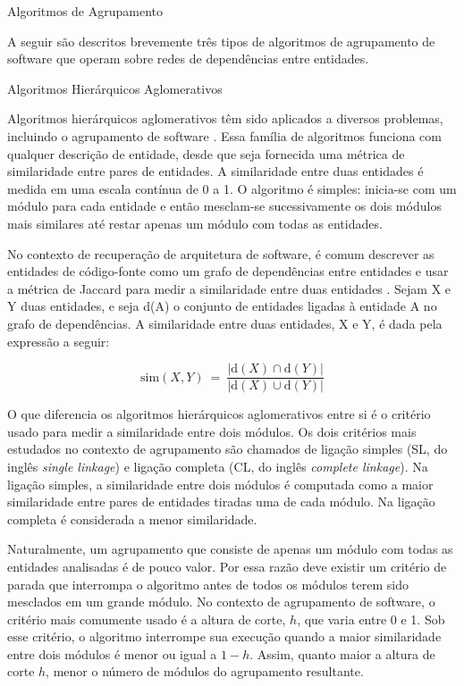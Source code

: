 \begin{chapter}{Algoritmos de Agrupamento} \label{cap:agrupamento}

A seguir são descritos brevemente três tipos de algoritmos de agrupamento de software que operam sobre redes de dependências entre entidades. %

\begin{section}{Algoritmos Hierárquicos Aglomerativos}

Algoritmos hierárquicos aglomerativos têm sido aplicados a diversos problemas, incluindo o agrupamento de software \cite{Anquetil1999,Maqbool2007}. Essa família de algoritmos funciona com qualquer descrição de entidade, desde que seja fornecida uma métrica de similaridade entre pares de entidades. A similaridade entre duas entidades é medida em uma escala contínua de 0 a 1. O algoritmo é simples: inicia-se com um módulo para cada entidade e então mesclam-se sucessivamente os dois módulos mais similares até restar apenas um módulo com todas as entidades.

No contexto de recuperação de arquitetura de software, é comum descrever as entidades de código-fonte como um grafo de dependências entre entidades e usar a métrica de Jaccard para medir a similaridade entre duas entidades \cite{Anquetil1999}. Sejam X e Y duas entidades, e seja d(A) o conjunto de entidades ligadas à entidade A no grafo de dependências. A similaridade entre duas entidades, X e Y, é dada pela expressão a seguir:

$$
\mathrm{sim}(X, Y) ~=~ \frac{|\mathrm{d}(X) \cap \mathrm{d}(Y)|}{|\mathrm{d}(X) \cup \mathrm{d}(Y)|}
$$

O que diferencia os algoritmos hierárquicos aglomerativos entre si é o critério usado para medir a similaridade entre dois módulos. Os dois critérios mais estudados no contexto de agrupamento são chamados de ligação simples (SL, do inglês \emph{single linkage}) e ligação completa (CL, do inglês \emph{complete linkage}). Na ligação simples, a similaridade entre dois módulos é computada como a maior similaridade entre pares de entidades tiradas uma de cada módulo. Na ligação completa é considerada a menor similaridade.

Naturalmente, um agrupamento que consiste de apenas um módulo com todas as entidades analisadas é de pouco valor. Por essa razão deve existir um critério de parada que interrompa o algoritmo antes de todos os módulos terem sido mesclados em um grande módulo. No contexto de agrupamento de software, o critério mais comumente usado é a altura de corte, $h$, que varia entre 0 e 1. Sob esse critério, o algoritmo interrompe sua execução quando a maior similaridade entre dois módulos é menor ou igual a $1 - h$. Assim, quanto maior a altura de corte $h$, menor o número de módulos do agrupamento resultante.
	

\end{section}
\end{chapter}
